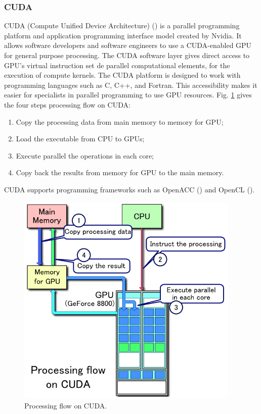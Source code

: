 \subsubsection{CUDA}

CUDA (Compute Unified Device Architecture) (\cite{nvidia2011nvidia}) is a parallel programming platform and application programming interface model created by Nvidia. It allows software developers and software engineers to use a CUDA-enabled GPU for general purpose processing. The CUDA software layer gives direct access to GPU's virtual instruction set de parallel computational elements, for the execution of compute kernels. The CUDA platform is designed to work with programming languages such as C, C++, and Fortran. This accessibility makes it easier for specialists in parallel programming to use GPU resources. Fig. \ref{cuda_flow} gives the four steps processing flow on CUDA:

\begin{enumerate}
	\item Copy the processing data from main memory to memory for GPU;
	\item Load the executable from CPU to GPUs;
	\item Execute parallel the operations in each core;
	\item Copy back the results from memory for GPU to the main memory.
\end{enumerate}

CUDA supports programming frameworks such as OpenACC (\cite{wienke2012openacc}) and OpenCL  (\cite{munshi2009opencl}). 

\begin{figure}[htbp]
	\centering
	\includegraphics[width=4.2in]{fig/CUDA.png}
	\caption{Processing flow on CUDA.}
	\label{cuda_flow}
\end{figure}

